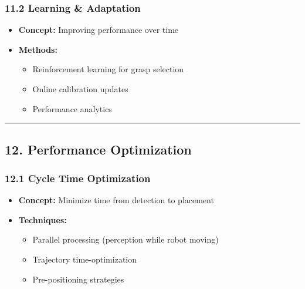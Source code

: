 \documentclass[
]{article}
\providecommand{\tightlist}{%
  \setlength{\itemsep}{0pt}\setlength{\parskip}{0pt}}
\begin{document}
\hypertarget{learning-adaptation}{%
\subsubsection{11.2 Learning \& Adaptation}\label{learning-adaptation}}

\begin{itemize}
\tightlist
\item
  \textbf{Concept:} Improving performance over time
\item
  \textbf{Methods:}

  \begin{itemize}
  \tightlist
  \item
    Reinforcement learning for grasp selection
  \item
    Online calibration updates
  \item
    Performance analytics
  \end{itemize}
\end{itemize}

\begin{center}\rule{0.5\linewidth}{0.5pt}\end{center}

\hypertarget{performance-optimization}{%
\subsection{12. Performance
Optimization}\label{performance-optimization}}

\hypertarget{cycle-time-optimization}{%
\subsubsection{12.1 Cycle Time
Optimization}\label{cycle-time-optimization}}

\begin{itemize}
\tightlist
\item
  \textbf{Concept:} Minimize time from detection to placement
\item
  \textbf{Techniques:}

  \begin{itemize}
  \tightlist
  \item
    Parallel processing (perception while robot moving)
  \item
    Trajectory time-optimization
  \item
    Pre-positioning strategies
  \end{itemize}
\end{itemize}
\end{document}
